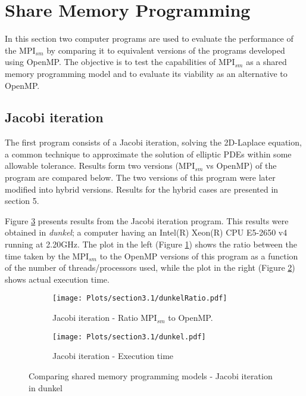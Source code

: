 \section{Share Memory Programming}

In this section two computer programs are used to evaluate the performance of the MPI$_{sm}$ by comparing it to equivalent versions of the programs developed using OpenMP. The objective is to test the capabilities of MPI$_{sm}$ as a shared memory programming model and to evaluate its viability as an alternative to OpenMP.


\subsection*{Jacobi iteration}
The first program consists of a Jacobi iteration, solving the 2D-Laplace equation, a common technique to approximate the solution of elliptic PDEs within some allowable tolerance. Results form two versions (MPI$_{sm}$ vs OpenMP) of the program are compared below. The two versions of this program were later modified into hybrid versions. Results for the hybrid cases are presented in section 5.

Figure \ref{fig:Figure1} presents results from the Jacobi iteration program. This results were obtained in \emph{dunkel}; a computer having an Intel(R) Xeon(R) CPU E5-2650 v4 running at 2.20GHz. The plot in the left (Figure \ref{fig:RatioDunkel}) shows the ratio between the time taken by the MPI$_{sm}$ to the OpenMP versions of this program as a function of the number of threads/processors used, while the plot in the right (Figure \ref{fig:TimeDunkel}) shows actual execution time.


\begin{figure} [h!]
    \centering
    \captionsetup{justification=raggedright, singlelinecheck=false}
    \begin{subfigure}{.6\textwidth}
      \hspace*{-1.5cm} 
      \texttt{[image: Plots/section3.1/dunkelRatio.pdf]}
      \caption[]{Jacobi iteration - Ratio MPI$_{sm}$ to OpenMP.}
      \label{fig:RatioDunkel}
    \end{subfigure}%
    \begin{subfigure}{.6\textwidth}
      \hspace*{-1.5cm} 
      \texttt{[image: Plots/section3.1/dunkel.pdf]}
      \caption{Jacobi iteration - Execution time}
      \label{fig:TimeDunkel}
    \end{subfigure}
\caption{Comparing shared memory programming models - Jacobi iteration in dunkel}
\label{fig:Figure1}
\end{figure}

